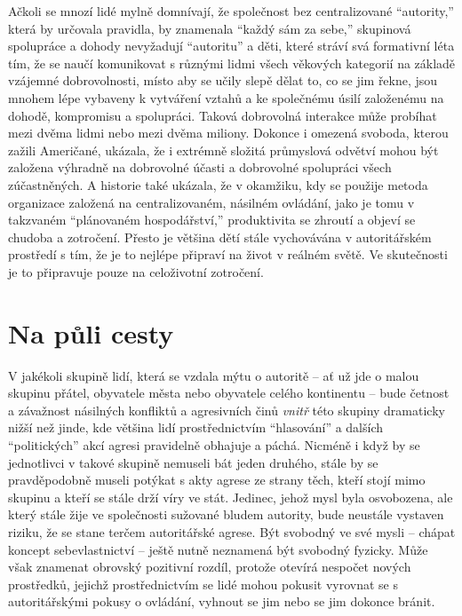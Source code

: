 \documentclass{book}
\begin{document}
Ačkoli se mnozí lidé mylně domnívají, že společnost bez centralizované \enquote{autority,} která by určovala pravidla, by znamenala \enquote{každý sám za sebe,} skupinová spolupráce a dohody nevyžadují \enquote{autoritu} a děti, které stráví svá formativní léta tím, že se naučí komunikovat s různými lidmi všech věkových kategorií na základě vzájemné dobrovolnosti, místo aby se učily slepě dělat to, co se jim řekne, jsou mnohem lépe vybaveny k vytváření vztahů a ke společnému úsilí založenému na dohodě, kompromisu a spolupráci. Taková dobrovolná interakce může probíhat mezi dvěma lidmi nebo mezi dvěma miliony. Dokonce i omezená svoboda, kterou zažili Američané, ukázala, že i extrémně složitá průmyslová odvětví mohou být založena výhradně na dobrovolné účasti a dobrovolné spolupráci všech zúčastněných. A historie také ukázala, že v okamžiku, kdy se použije metoda organizace založená na centralizovaném, násilném ovládání, jako je tomu v takzvaném \enquote{plánovaném hospodářství,} produktivita se zhroutí a objeví se chudoba a zotročení. Přesto je většina dětí stále vychovávána v autoritářském prostředí s tím, že je to nejlépe připraví na život v reálném světě. Ve skutečnosti je to připravuje pouze na celoživotní zotročení.

\section{Na půli cesty}

V jakékoli skupině lidí, která se vzdala mýtu o autoritě -- ať už jde o malou skupinu přátel, obyvatele města nebo obyvatele celého kontinentu -- bude četnost a závažnost násilných konfliktů a agresivních činů \emph{vnitř} této skupiny dramaticky nižší než jinde, kde většina lidí prostřednictvím \enquote{hlasování} a dalších \enquote{politických} akcí agresi pravidelně obhajuje a páchá. Nicméně i když by se jednotlivci v takové skupině nemuseli bát jeden druhého, stále by se pravděpodobně museli potýkat s akty agrese ze strany těch, kteří stojí mimo skupinu a kteří se stále drží víry ve stát. Jedinec, jehož mysl byla osvobozena, ale který stále žije ve společnosti sužované bludem autority, bude neustále vystaven riziku, že se stane terčem autoritářské agrese. Být svobodný ve své mysli -- chápat koncept sebevlastnictví -- ještě nutně neznamená být svobodný fyzicky. Může však znamenat obrovský pozitivní rozdíl, protože otevírá nespočet nových prostředků, jejichž prostřednictvím se lidé mohou pokusit vyrovnat se s autoritářskými pokusy o ovládání, vyhnout se jim nebo se jim dokonce bránit.
\end{document}
